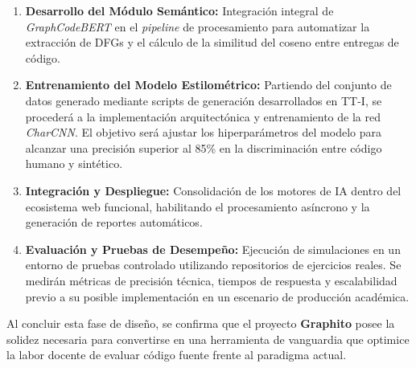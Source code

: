 \begin{enumerate}
    \item \textbf{Desarrollo del Módulo Semántico:} Integración integral de \textit{GraphCodeBERT} en el \textit{pipeline} de procesamiento para automatizar la extracción de DFGs y el cálculo de la similitud del coseno entre entregas de código.
    
    \item \textbf{Entrenamiento del Modelo Estilométrico:} Partiendo del conjunto de datos generado mediante scripts de generación desarrollados en TT-I, se procederá a la implementación arquitectónica y entrenamiento de la red \textit{CharCNN}. El objetivo será ajustar los hiperparámetros del modelo para alcanzar una precisión superior al 85\% en la discriminación entre código humano y sintético.
    
    \item \textbf{Integración y Despliegue:} Consolidación de los motores de IA dentro del ecosistema web funcional, habilitando el procesamiento asíncrono y la generación de reportes automáticos.
    
    \item \textbf{Evaluación y Pruebas de Desempeño:} Ejecución de simulaciones en un entorno de pruebas controlado utilizando repositorios de ejercicios reales. Se medirán métricas de precisión técnica, tiempos de respuesta y escalabilidad previo a su posible implementación en un escenario de producción académica.
\end{enumerate}

Al concluir esta fase de diseño, se confirma que el proyecto \textbf{Graphito} posee la solidez necesaria para convertirse en una herramienta de vanguardia que optimice la labor docente de evaluar código fuente frente al paradigma actual.